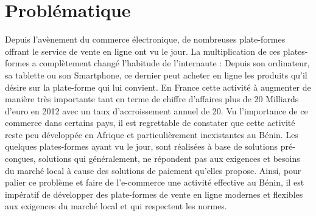 \section{Problématique}

Depuis l’avènement du commerce électronique, de nombreuses plate-formes offrant le service de vente en ligne ont vu le jour. La multiplication de ces plates-formes a complètement changé
l’habitude de l’internaute : Depuis son ordinateur, sa tablette ou son Smartphone, ce dernier peut acheter en ligne les produits qu’il désire sur la plate-forme qui lui convient.
En France cette activité à augmenter de manière très importante tant en terme de chiffre d'affaires plus de 20 Milliards d'euro en 2012 avec un taux d'accroissement annuel de 20\textdiscount. Vu l'importance de ce commerce dans certains pays, il est regrettable de constater que cette activité reste peu développée en Afrique et particulièrement inexistantes au Bénin. Les quelques plates-formes ayant vu le jour, sont réalisées à base de solutions pré-conçues, solutions qui généralement, ne répondent pas aux exigences et besoins du marché local à cause des solutions de paiement qu'elles propose. Ainsi, pour palier ce problème et faire de l’e-commerce une activité effective au Bénin, il est impératif de développer des plate-formes de vente en ligne modernes et flexibles aux exigences du marché local et qui respectent les normes.
